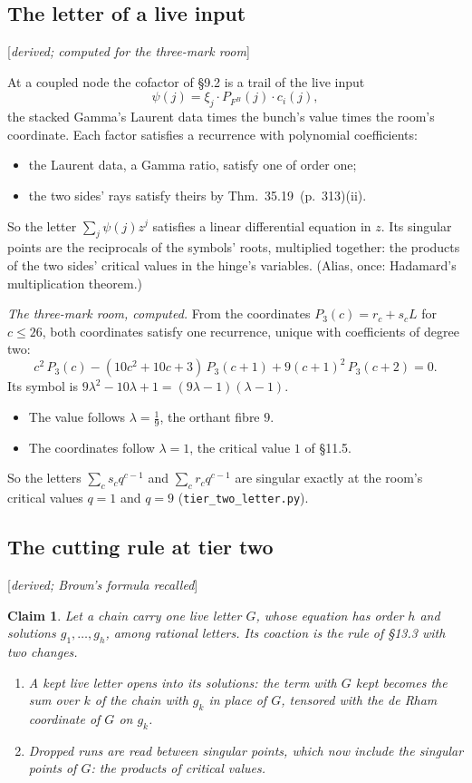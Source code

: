\documentclass[11pt]{article}
\newcommand{\status}[1]{\hfill{\small[\textit{#1}]}}
\newcommand{\hb}[2]{#1~(p.~#2)}   %
\theoremstyle{plain}
\newtheorem{claim}{Claim}[section]
\theoremstyle{remark}
\begin{document}
\subsection{The letter of a live input}\status{derived; computed for the three-mark room}

At a coupled node the cofactor of \S9.2 is a trail of the live input
\[
\psi(j)=\xi_j\cdot P_{F^B}(j)\cdot c_i(j),
\]
the stacked Gamma's Laurent data times the bunch's value times the room's coordinate. Each factor satisfies a recurrence with polynomial coefficients:
\begin{itemize}
\item the Laurent data, a Gamma ratio, satisfy one of order one;
\item the two sides' rays satisfy theirs by Thm.~\hb{35.19}{313}(ii).
\end{itemize}
So the letter $\sum_j\psi(j)z^j$ satisfies a linear differential equation in $z$. Its singular points are the reciprocals of the symbols' roots, multiplied together: the products of the two sides' critical values in the hinge's variables. (Alias, once: Hadamard's multiplication theorem.)

\emph{The three-mark room, computed.} From the coordinates $P_3(c)=r_c+s_cL$ for $c\le26$, both coordinates satisfy one recurrence, unique with coefficients of degree two:
\[
c^2\,P_3(c)-(10c^2+10c+3)\,P_3(c+1)+9(c+1)^2\,P_3(c+2)=0 .
\]
Its symbol is $9\lambda^2-10\lambda+1=(9\lambda-1)(\lambda-1)$.
\begin{itemize}
\item The value follows $\lambda=\frac19$, the orthant fibre $9$.
\item The coordinates follow $\lambda=1$, the critical value $1$ of \S11.5.
\end{itemize}
So the letters $\sum_cs_cq^{c-1}$ and $\sum_cr_cq^{c-1}$ are singular exactly at the room's critical values $q=1$ and $q=9$ (\texttt{tier\_two\_letter.py}).

\subsection{The cutting rule at tier two}\status{derived; Brown's formula recalled}

\begin{claim}\label{cl:tiertwo}
Let a chain carry one live letter $G$, whose equation has order $h$ and solutions $g_1,\dots,g_h$, among rational letters. Its coaction is the rule of \S13.3 with two changes.
\begin{enumerate}[label=(\roman*)]
\item A kept live letter opens into its solutions: the term with $G$ kept becomes the sum over $k$ of the chain with $g_k$ in place of $G$, tensored with the de Rham coordinate of $G$ on $g_k$.
\item Dropped runs are read between singular points, which now include the singular points of $G$: the products of critical values.
\end{enumerate}
\end{claim}
\end{document}

